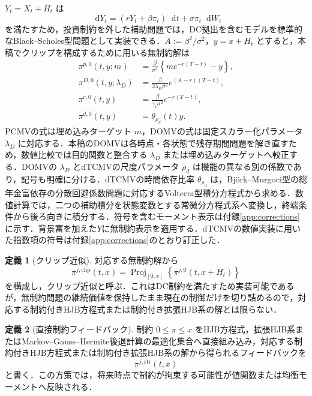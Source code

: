 \documentclass[10pt,a4paper]{article}
\theoremstyle{plain}
\theoremstyle{definition}
\newtheorem{definition}{定義}
\DeclareMathOperator{\Proj}{Proj}
\newcommand{\dd}{\mathop{}\!\mathrm{d}}
\begin{document}
$Y_t=X_t+H_t$ は
\[
\dd Y_t=(rY_t+\beta\pi_t)\dd t+\sigma\pi_t\dd W_t
\]
を満たすため，投資制約を外した補助問題では，DC拠出を含むモデルを標準的なBlack--Scholes型問題として実装できる．$A:=\beta^2/\sigma^2$，$y=x+H_t$ とすると，本稿でクリップを構成するために用いる無制約解は
\begin{align}
  \pi^{p,0}(t,y;m)
  &=\frac{\beta}{\sigma^2}\left\{m e^{-r(T-t)}-y\right\},\label{eq:unc-p}\\
  \pi^{D,0}(t,y;\lambda_D)
  &=\frac{\beta}{2\lambda_D\sigma^2}e^{(A-r)(T-t)},\label{eq:unc-D}\\
  \pi^{c,0}(t,y)
  &=\frac{\beta}{\gamma_c\sigma^2}e^{-r(T-t)},\label{eq:unc-c}\\
  \pi^{d,0}(t,y)
  &=\theta_{\rho_d}(t)y.\label{eq:unc-d}
\end{align}
PCMVの式は埋め込みターゲット $m$，DOMVの式は固定スカラー化パラメータ $\lambda_D$ に対応する．本稿のDOMVは各時点・各状態で残存期間問題を解き直すため，数値比較では目的関数と整合する $\lambda_D$ または埋め込みターゲットへ較正する．DOMVの $\lambda_D$ とdTCMVの尺度パラメータ $\rho_d$ は機能の異なる別の係数であり，記号も明確に分ける．dTCMVの時間依存比率 $\theta_{\rho_d}$ は，Björk--Murgoci型の総年金富依存の分散回避係数問題に対応するVolterra型積分方程式から求める．数値計算では，二つの補助積分を状態変数とする常微分方程式系へ変換し，終端条件から後ろ向きに積分する．符号を含むモーメント表示は付録\ref{app:corrections}に示す．背景富を加えた$Y$に無制約表示を適用する．dTCMVの数値実装に用いた指数項の符号は付録\ref{app:corrections}のとおり訂正した．

\begin{definition}[クリップ近似]
対応する無制約解から
\begin{equation}
  \pi^{j,\mathrm{clip}}(t,x)
  =\Proj_{[0,x]}\!\left\{\pi^{j,0}(t,x+H_t)\right\}
  \label{eq:クリップ-def}
\end{equation}
を構成し，クリップ近似と呼ぶ．これはDC制約を満たすため実装可能であるが，無制約問題の継続価値を保持したまま現在の制御だけを切り詰めるので，対応する制約付きHJB方程式または制約付き拡張HJB系の解とは限らない．
\end{definition}

\begin{definition}[直接制約フィードバック]
制約 $0\leq\pi\leq x$ をHJB方程式，拡張HJB系またはMarkov--Gauss--Hermite後退計算の最適化集合へ直接組み込み，対応する制約付きHJB方程式または制約付き拡張HJB系の解から得られるフィードバックを
\[
  \pi^{j,\mathrm{str}}(t,x)
\]
と書く．この方策では，将来時点で制約が拘束する可能性が値関数または均衡モーメントへ反映される．
\end{definition}
\end{document}
